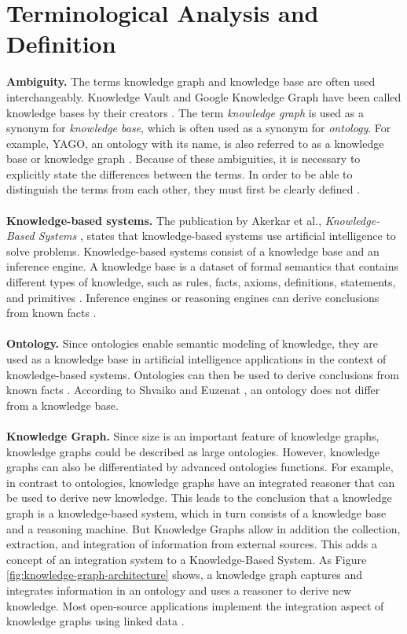 ﻿\documentclass[11pt,titlepage,oneside,openany]{book}
\begin{document}
\section{Terminological Analysis and Definition}
\textbf{Ambiguity.} The terms knowledge graph and knowledge base are often used interchangeably. Knowledge Vault and Google Knowledge Graph have been called knowledge bases by their creators \cite{Dong2014KnowledgeVA}. The term \textit{knowledge graph} is used as a synonym for \textit{knowledge base}, which is often used as a synonym for \textit{ontology}. For example, YAGO, an ontology with its name, is also referred to as a knowledge base \cite{Ringler2017OneKG} or knowledge graph \cite{TDKG02}. Because of these ambiguities, it is necessary to explicitly state the differences between the terms. In order to be able to distinguish the terms from each other, they must first be clearly defined \cite{TDKG01}.
\\
\\
\textbf{Knowledge-based systems.} The publication by Akerkar et al., \textit{Knowledge-Based Systems} \cite{TDKG03}, states that knowledge-based systems use artificial intelligence to solve problems. Knowledge-based systems consist of a knowledge base and an inference engine. A knowledge base is a dataset of formal semantics that contains different types of knowledge, such as rules, facts, axioms, definitions, statements, and primitives \cite{TDKG03}. Inference engines or reasoning engines can derive conclusions from known facts \cite{Feilmayr2016AnAO}.  
\\
\\
\textbf{Ontology.} Since ontologies enable semantic modeling of knowledge, they are used as a knowledge base in artificial intelligence applications in the context of knowledge-based systems. Ontologies can then be used to derive conclusions from known facts \cite{TDKG05}. According to Shvaiko and Euzenat \cite{Shvaiko2013OntologyMS}, an ontology does not differ from a knowledge base.
\\
\\
\textbf{Knowledge Graph.} Since size is an important feature of knowledge graphs, knowledge graphs could be described as large ontologies. However, knowledge graphs can also be differentiated by advanced ontologies functions. For example, in contrast to ontologies, knowledge graphs have an integrated reasoner that can be used to derive new knowledge. This leads to the conclusion that a knowledge graph is a knowledge-based system, which in turn consists of a knowledge base and a reasoning machine. But Knowledge Graphs allow in addition the collection, extraction, and integration of information from external sources. This adds a concept of an integration system to a Knowledge-Based System. As Figure \ref{fig:knowledge-graph-architecture} shows, a knowledge graph captures and integrates information in an ontology and uses a reasoner to derive new knowledge. Most open-source applications implement the integration aspect of knowledge graphs using linked data \cite{TDKG01}.
\\
\\ 
\end{document}
